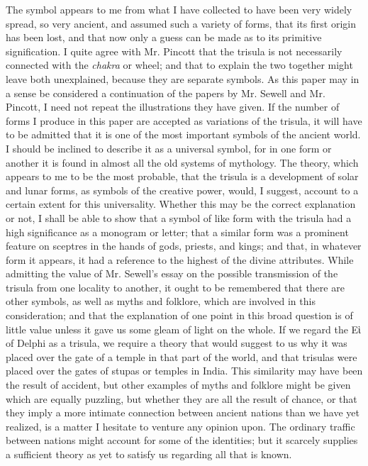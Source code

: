 \documentclass[a4paper, 11pt, oneside, english]{article}
\begin{document}
The symbol appears to me from what I have collected to have been very widely spread, so very ancient, and assumed such a variety of forms, that its first origin has been lost, and that now only a guess can be made as to its primitive signification. I quite agree with Mr. Pincott that the trisula is not necessarily connected with the \emph{chakra} or wheel; and that to explain the two together might leave both unexplained, because they are separate symbols. As this paper may in a sense be considered a continuation of the papers by Mr. Sewell and Mr. Pincott, I need not repeat the illustrations they have given. If the number of forms I produce in this paper are accepted as variations of the trisula, it will have to be admitted that it is one of the most important symbols of the ancient world. I should be inclined to describe it as a universal symbol, for in one form or another it is found in almost all the old systems of mythology. The theory, which appears to me to be the most probable, that the trisula is a development of solar and lunar forms, as symbols of the creative power, would, I suggest, account to a certain extent for this universality. Whether this may be the correct explanation or not, I shall be able to show that a symbol of like form with the trisula had a high significance as a monogram or letter; that a similar form was a prominent feature on sceptres in the hands of gods, priests, and kings; and that, in whatever form it appears, it had a reference to the highest of the divine attributes. While admitting the value of Mr. Sewell's essay on the possible transmission of the trisula from one locality to another, it ought to be remembered that there are other symbols, as well as myths and folklore, which are involved in this consideration; and that the explanation of one point in this broad question is of little value unless it gave us some gleam of light on the whole. If we regard the Εὶ of Delphi as a trisula, we require a theory that would suggest to us why it was placed over the gate of a temple in that part of the world, and that trisulas were placed over the gates of stupas or temples in India. This similarity may have been the result of accident, but other examples of myths and folklore might be given which are equally puzzling, but whether they are all the result of chance, or that they imply a more intimate connection between ancient nations than we have yet realized, is a matter I hesitate to venture any opinion upon. The ordinary traffic between nations might account for some of the identities; but it scarcely supplies a sufficient theory as yet to satisfy us regarding all that is known.
\end{document}
